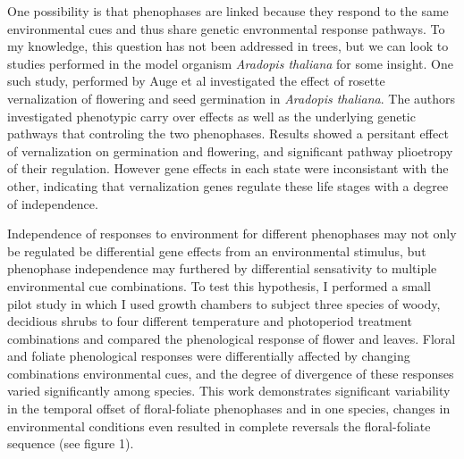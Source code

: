 \documentclass{article}\usepackage[]{graphicx}\usepackage[]{color}
\begin{document}
\par One possibility is that phenophases are linked because they respond to the same environmental cues and thus share genetic envronmental response pathways. To my knowledge, this question has not been addressed in trees, but we can look to studies performed in the model organism \textit{Aradopis thaliana} for some insight. One such study, performed by Auge et al \citeyear{Auge2017} investigated the effect of rosette vernalization of flowering and seed germination in \textit{Aradopis thaliana}. The authors investigated phenotypic carry over effects as well as the underlying genetic pathways that controling the two phenophases. Results showed a persitant effect of vernalization on germination and flowering, and significant pathway plioetropy of their regulation. However gene effects in each state were inconsistant with the other, indicating that vernalization genes regulate these life stages with a degree of independence.
\par Independence of responses to environment for different phenophases may not only be regulated be differential gene effects from an environmental stimulus, but phenophase independence may furthered by differential sensativity to multiple environmental cue combinations. To test this hypothesis, I performed a small pilot study in which I used growth chambers to  subject three species of woody, decidious shrubs to four different temperature and photoperiod treatment combinations and compared the phenological response of flower and leaves. Floral and foliate phenological responses were differentially affected by changing combinations environmental cues, and  the degree of divergence of these responses varied significantly among species. This work demonstrates significant variability in the temporal offset of floral-foliate phenophases and in one species, changes in environmental conditions even resulted in complete reversals the floral-foliate sequence (see figure 1).
\end{document}
